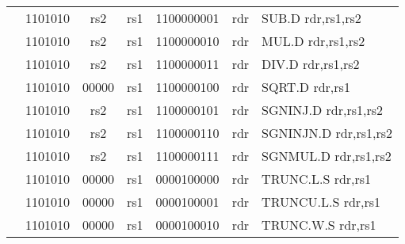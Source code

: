 \begin{table}[p]
\begin{small}
\begin{center}
\begin{tabular}{rcccccccccl}
&
\multicolumn{2}{|c|}{1101010} &
\multicolumn{1}{c|}{rs2} &
\multicolumn{1}{c|}{rs1} &
\multicolumn{4}{c|}{1100000001} &
\multicolumn{1}{c|}{rdr} & SUB.D rdr,rs1,rs2 \\
\cline{2-10}
  

&
\multicolumn{2}{|c|}{1101010} &
\multicolumn{1}{c|}{rs2} &
\multicolumn{1}{c|}{rs1} &
\multicolumn{4}{c|}{1100000010} &
\multicolumn{1}{c|}{rdr} & MUL.D rdr,rs1,rs2 \\
\cline{2-10}
  

&
\multicolumn{2}{|c|}{1101010} &
\multicolumn{1}{c|}{rs2} &
\multicolumn{1}{c|}{rs1} &
\multicolumn{4}{c|}{1100000011} &
\multicolumn{1}{c|}{rdr} & DIV.D rdr,rs1,rs2 \\
\cline{2-10}
  

&
\multicolumn{2}{|c|}{1101010} &
\multicolumn{1}{c|}{00000} &
\multicolumn{1}{c|}{rs1} &
\multicolumn{4}{c|}{1100000100} &
\multicolumn{1}{c|}{rdr} & SQRT.D rdr,rs1 \\
\cline{2-10}
  

&
\multicolumn{2}{|c|}{1101010} &
\multicolumn{1}{c|}{rs2} &
\multicolumn{1}{c|}{rs1} &
\multicolumn{4}{c|}{1100000101} &
\multicolumn{1}{c|}{rdr} & SGNINJ.D rdr,rs1,rs2 \\
\cline{2-10}
  

&
\multicolumn{2}{|c|}{1101010} &
\multicolumn{1}{c|}{rs2} &
\multicolumn{1}{c|}{rs1} &
\multicolumn{4}{c|}{1100000110} &
\multicolumn{1}{c|}{rdr} & SGNINJN.D rdr,rs1,rs2 \\
\cline{2-10}
  

&
\multicolumn{2}{|c|}{1101010} &
\multicolumn{1}{c|}{rs2} &
\multicolumn{1}{c|}{rs1} &
\multicolumn{4}{c|}{1100000111} &
\multicolumn{1}{c|}{rdr} & SGNMUL.D rdr,rs1,rs2 \\
\cline{2-10}
  

&
\multicolumn{2}{|c|}{1101010} &
\multicolumn{1}{c|}{00000} &
\multicolumn{1}{c|}{rs1} &
\multicolumn{4}{c|}{0000100000} &
\multicolumn{1}{c|}{rdr} & TRUNC.L.S rdr,rs1 \\
\cline{2-10}
  

&
\multicolumn{2}{|c|}{1101010} &
\multicolumn{1}{c|}{00000} &
\multicolumn{1}{c|}{rs1} &
\multicolumn{4}{c|}{0000100001} &
\multicolumn{1}{c|}{rdr} & TRUNCU.L.S rdr,rs1 \\
\cline{2-10}
  

&
\multicolumn{2}{|c|}{1101010} &
\multicolumn{1}{c|}{00000} &
\multicolumn{1}{c|}{rs1} &
\multicolumn{4}{c|}{0000100010} &
\multicolumn{1}{c|}{rdr} & TRUNC.W.S rdr,rs1 \\
\cline{2-10}
  


\end{tabular}
\end{center}
\end{small}
\end{table}
